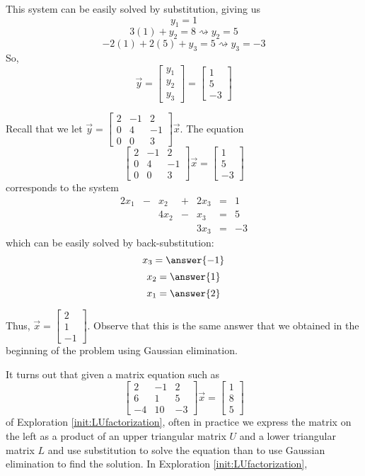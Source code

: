 \documentclass{ximera}
\begin{document}
\begin{exploration}
This system can be easily solved by substitution, giving us
$$y_1=1$$
$$3(1)+y_2=8 \rightsquigarrow y_2=5$$
$$-2(1)+2(5)+y_3=5 \rightsquigarrow y_3=-3$$
So,
$$\vec{y}=\begin{bmatrix}y_1\\y_2\\y_3\end{bmatrix}=\begin{bmatrix}1\\5\\-3\end{bmatrix}$$
    
Recall that we let $\vec{y}=\begin{bmatrix}2&-1&2\\0&4&-1\\0&0&3\end{bmatrix}\vec{x}$.  
The equation
$$\begin{bmatrix}2&-1&2\\0&4&-1\\0&0&3\end{bmatrix}\vec{x}=\begin{bmatrix}1\\5\\-3\end{bmatrix}$$
corresponds to the system
$$\begin{matrix}
	 2x_1& -&x_2&+&2x_3&=&1\\
	   & &4x_2&-&x_3&= &5 \\
      & &&&3x_3&=&-3
    \end{matrix}$$
    which can be easily solved by back-substitution:
    $$x_3=\answer{-1}$$
    $$x_2=\answer{1}$$
    $$x_1=\answer{2}$$
    
    Thus, $\vec{x}=\begin{bmatrix}2\\1\\-1\end{bmatrix}$.  Observe that this is the same answer that we obtained in the beginning of the problem using Gaussian elimination.  
\end{exploration}

It turns out that given a matrix equation such as 
$$\begin{bmatrix}2&-1&2\\6&1&5\\-4&10&-3\end{bmatrix}\vec{x}=\begin{bmatrix}1\\8\\5\end{bmatrix}$$
of Exploration \ref{init:LUfactorization}, often in practice we express the matrix on the left as a product of an upper triangular matrix $U$ and a lower triangular matrix $L$ and use substitution to solve the equation than to use Gaussian elimination to find the solution.  In Exploration \ref{init:LUfactorization}, 
\end{document}
